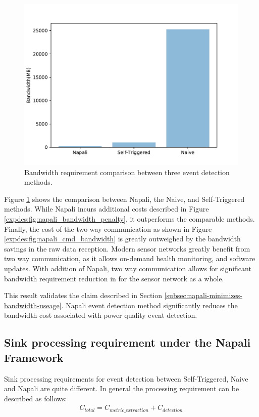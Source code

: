 \begin{figure}[ht!]
    \centering
    \includegraphics[width=0.8\linewidth]{img/napali_eval/napali_bandwidth_comparison.pdf}
    \caption{Bandwidth requirement comparison between three event detection methods.}
    \label{expdes:fig:bandwidth_master_comparison}
\end{figure}

Figure \ref{expdes:fig:bandwidth_master_comparison} shows the comparison between Napali, the Naive, and Self-Triggered methods.
While Napali incurs additional costs described in Figure \ref{expdes:fig:napali_bandwidth_penalty}, it outperforms the comparable methods.
Finally, the cost of the two way communication as shown in Figure \ref{expdes:fig:napali_cmd_bandwidth} is greatly outweighed by the bandwidth savings in the raw data reception.
Modern sensor networks greatly benefit from two way communication, as it allows on-demand health monitoring, and software updates.
With addition of Napali, two way communication allows for significant bandwidth requirement reduction in for the sensor network as a whole.

This result validates the claim described in Section \ref{subsec:napali-minimizes-bandwidth-useage}.
Napali event detection method significantly reduces the bandwidth cost associated with power quality event detection.

\subsection{Sink processing requirement under the Napali Framework}\label{subsec:sink-processing-requirement-under-the-napali-framework}
Sink processing requirements for event detection between Self-Triggered, Naive and Napali are quite different.
In general the processing requirement can be described as follows:
\begin{equation}\label{eq:detection_cost}
\begin{aligned}
    C_{total} = C_{metric\_extraction} + C_{detection}
\end{aligned}
\end{equation}

